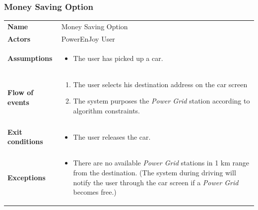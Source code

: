 \documentclass[english]{article}
\newcommand{\powergrid}{\textit{Power Grid }}
\begin{document}
	\subsubsection{Money Saving Option}
	\begin{center}
	\begin{tabular}{l||p{10cm}}
	\textbf{Name} 
		& Money Saving Option\\ [8px]
	\textbf{Actors} 
		& PowerEnJoy User\\ [8px]
	\textbf{Assumptions} 
	& \begin{itemize}
		\item The user has picked up a car. 
	\end{itemize}\\
	\textbf{Flow of events}
		& \begin{enumerate}
 		\item The user selects his destination address on the car screen
		\item The system purposes the \powergrid station according to algorithm constraints.
		\end{enumerate}\\ 
	\textbf{Exit conditions}
		&\begin{itemize}
			\item The user releases the car.
		\end{itemize}\\
	\textbf{Exceptions}
		& \begin{itemize}
			\item There are no available \powergrid stations in 1 km range from the destination. (The system during driving will notify the user through the car screen if a \powergrid becomes free.)
		\end{itemize}
	\end{tabular}
	\end{center}
\end{document}
